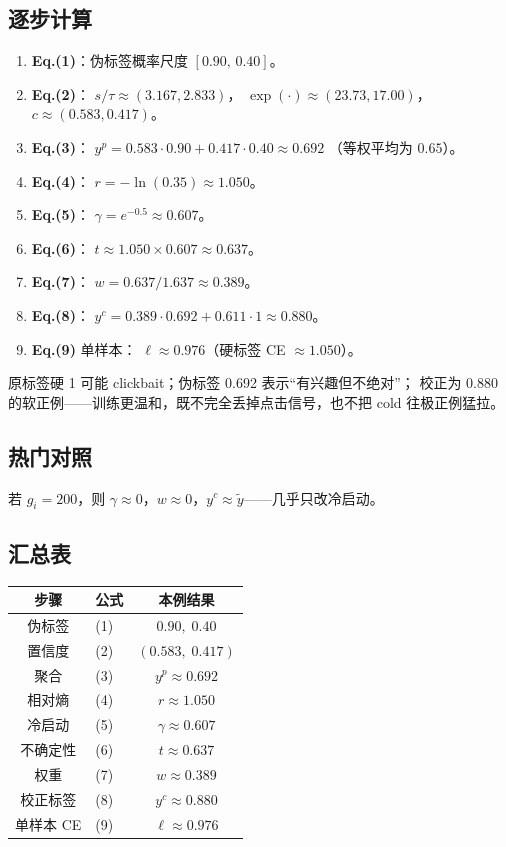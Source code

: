 \documentclass[11pt,a4paper]{ctexart}
\begin{document}
\subsection{逐步计算}
\begin{enumerate}
  \item \textbf{Eq.(1)}：伪标签概率尺度 $[0.90,\,0.40]$。
  \item \textbf{Eq.(2)}：
  $s/\tau\approx(3.167,2.833)$，
  $\exp(\cdot)\approx(23.73,17.00)$，
  $c\approx(0.583,0.417)$。
  \item \textbf{Eq.(3)}：
  $y^{p}=0.583\cdot0.90+0.417\cdot0.40\approx0.692$
  （等权平均为 $0.65$）。
  \item \textbf{Eq.(4)}：
  $r=-\ln(0.35)\approx1.050$。
  \item \textbf{Eq.(5)}：
  $\gamma=e^{-0.5}\approx0.607$。
  \item \textbf{Eq.(6)}：
  $t\approx1.050\times0.607\approx0.637$。
  \item \textbf{Eq.(7)}：
  $w=0.637/1.637\approx0.389$。
  \item \textbf{Eq.(8)}：
  $y^{c}=0.389\cdot0.692+0.611\cdot1\approx0.880$。
  \item \textbf{Eq.(9)} 单样本：
  $\ell\approx0.976$（硬标签 CE $\approx1.050$）。
\end{enumerate}

\begin{tipbox}[故事线]
原标签硬 1 可能 clickbait；伪标签 0.692 表示“有兴趣但不绝对”；
校正为 0.880 的软正例——训练更温和，既不完全丢掉点击信号，也不把 cold 往极正例猛拉。
\end{tipbox}

\subsection{热门对照}
若 $g_i=200$，则 $\gamma\approx0$，$w\approx0$，$y^{c}\approx\tilde{y}$——几乎只改冷启动。

\subsection{汇总表}
\begin{center}
\small
\begin{tabular}{clc}
\toprule
步骤 & 公式 & 本例结果 \\
\midrule
伪标签 & (1) & $0.90,\;0.40$ \\
置信度 & (2) & $(0.583,\;0.417)$ \\
聚合 & (3) & $y^{p}\approx0.692$ \\
相对熵 & (4) & $r\approx1.050$ \\
冷启动 & (5) & $\gamma\approx0.607$ \\
不确定性 & (6) & $t\approx0.637$ \\
权重 & (7) & $w\approx0.389$ \\
校正标签 & (8) & $y^{c}\approx0.880$ \\
单样本 CE & (9) & $\ell\approx0.976$ \\
\bottomrule
\end{tabular}
\end{center}
\end{document}
